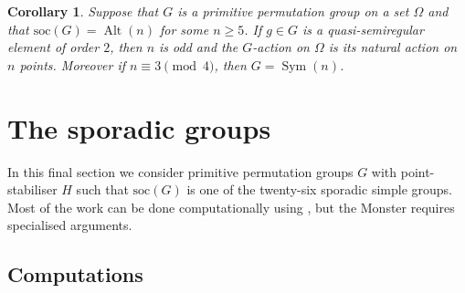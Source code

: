 \documentclass{article}
\newtheorem{cor}[thm]{Corollary}
\theoremstyle{remark}
\theoremstyle{definition}
\DeclareMathOperator{\Alt}{Alt}
\DeclareMathOperator{\Sym}{Sym}
\newcommand{\soc}{\mathrm{soc}}
\newcommand{\qsre}{quasi-semiregular element}
\begin{document}
\begin{cor}
    Suppose that $G$ is a primitive permutation group on a set $\Omega$ and that $\soc(G)=\Alt(n)$ for some $n\geqslant 5$. If $g\in G$ is a {\qsre} of order  $2$, then $n$ is odd and the $G$-action on $\Omega$ is its natural action on $n$ points. Moreover if $n\equiv 3 \pmod 4$, then $G=\Sym(n)$.
\end{cor}


\section{The sporadic groups}

In this final section we consider  primitive permutation groups $G$ with point-stabiliser $H$ such that $\soc(G)$ is one of the twenty-six sporadic simple groups. Most of the work can be done computationally using \cite{GAP4}, but the Monster requires specialised arguments.

\subsection{Computations}
\end{document}
